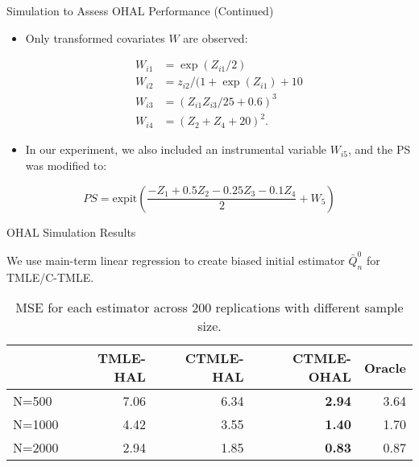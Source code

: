 \documentclass[t]{beamer}
\newlength{\wideitemsep}
\let\olditem\item
\renewcommand{\item}{\setlength{\itemsep}{\wideitemsep}\olditem}
\begin{document}
\begin{frame}{Simulation to Assess OHAL Performance (Continued)}
\begin{itemize}
\item Only transformed covariates $W$ are observed:

 \begin{equation*}
       \begin{aligned}
         W_{i1}& = \exp(Z_{i1}/2) \\
         W_{i2}& = z_{i2}/(1+\exp(Z_{i1}) + 10\\
         W_{i3}& = (Z_{i1}Z_{i3}/25 + 0.6)^3\\
         W_{i4}& = (Z_2  + Z_4 + 20)^2.
      \end{aligned}
 \end{equation*}
 \vspace{.2in}
\item In our experiment, we also included an instrumental variable $W_{i5}$, and the PS was modified to:
\end{itemize}
 \begin{equation*}
  PS = \text{expit}\left(\frac{- Z_{1} + 0.5 Z_{2} - 0.25 Z_{3} - 0.1 Z_{4}}{2} + W_{5}\right)
 \end{equation*}

\end{frame}


\begin{frame}{OHAL Simulation Results}

We use main-term linear regression to create biased initial estimator $\bar{Q}_n^0$ for TMLE/C-TMLE.

\begin{table}[ht]
\centering
\begin{tabular}{l|rrrr}
  &  {\small TMLE-HAL} & {\small CTMLE-HAL} & {\small CTMLE-OHAL} & Oracle \\
   \hline \hline
N=500  & 7.06 & 6.34 & \textbf{2.94} & 3.64 \\
N=1000  & 4.42 & 3.55 & \textbf{1.40} & 1.70 \\
N=2000  & 2.94 & 1.85 & \textbf{0.83} & 0.87 \\
   \hline
\end{tabular}
\caption{MSE for each estimator across 200 replications with different sample size. }
\end{table}


\end{frame}
\end{document}
